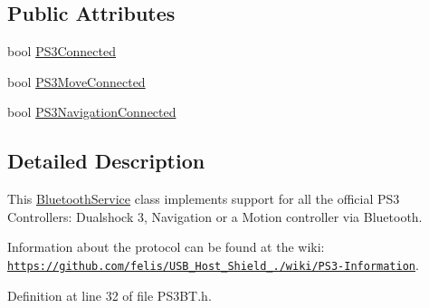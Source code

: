 \subsection*{\-Public \-Attributes}
\begin{DoxyCompactItemize}
\item 
bool \hyperlink{class_p_s3_b_t_a2804535e3164eafca80a6f6c6bd9a4f9}{\-P\-S3\-Connected}
\item 
bool \hyperlink{class_p_s3_b_t_a9273b6796948b83772117b3805421b4a}{\-P\-S3\-Move\-Connected}
\item 
bool \hyperlink{class_p_s3_b_t_ab35277632083d43f8750d130bea6d430}{\-P\-S3\-Navigation\-Connected}
\end{DoxyCompactItemize}


\subsection{\-Detailed \-Description}
\-This \hyperlink{class_bluetooth_service}{\-Bluetooth\-Service} class implements support for all the official \-P\-S3 \-Controllers\-: \-Dualshock 3, \-Navigation or a \-Motion controller via \-Bluetooth.

\-Information about the protocol can be found at the wiki\-: \href{https://github.com/felis/USB_Host_Shield_2.0/wiki/PS3-Information}{\tt https\-://github.\-com/felis/\-U\-S\-B\-\_\-\-Host\-\_\-\-Shield\-\_./wiki/\-P\-S3-\/\-Information}. 

\-Definition at line 32 of file \-P\-S3\-B\-T.\-h.



